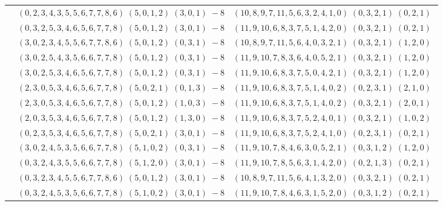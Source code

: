 \documentclass[11pt]{article}
\begin{document}
\begin{longtable}[l]{|c|c|c|}
 \cline{2-3} 
 & $(0 ,2 ,3 ,4 ,3 ,5 ,5 ,6 ,7 ,7 ,8 ,6) \;(5 ,0 ,1 ,2) \;(3 ,0 ,1) \;-8$ & $(10 ,8 ,9 ,7 ,11 ,5 ,6 ,3 ,2 ,4 ,1 ,0) \;(0 ,3 ,2 ,1) \;(0 ,2 ,1) \;$\\ 
 \cline{2-3} 
 & $(0 ,3 ,2 ,5 ,3 ,4 ,6 ,5 ,6 ,7 ,7 ,8) \;(5 ,0 ,1 ,2) \;(3 ,0 ,1) \;-8$ & $(11 ,9 ,10 ,6 ,8 ,3 ,7 ,5 ,1 ,4 ,2 ,0) \;(0 ,3 ,2 ,1) \;(0 ,2 ,1) \;$\\ 
 \cline{2-3} 
 & $(3 ,0 ,2 ,3 ,4 ,5 ,5 ,6 ,7 ,7 ,8 ,6) \;(5 ,0 ,1 ,2) \;(0 ,3 ,1) \;-8$ & $(10 ,8 ,9 ,7 ,11 ,5 ,6 ,4 ,0 ,3 ,2 ,1) \;(0 ,3 ,2 ,1) \;(1 ,2 ,0) \;$\\ 
 \cline{2-3} 
 & $(3 ,0 ,2 ,5 ,4 ,3 ,5 ,6 ,6 ,7 ,7 ,8) \;(5 ,0 ,1 ,2) \;(0 ,3 ,1) \;-8$ & $(11 ,9 ,10 ,7 ,8 ,3 ,6 ,4 ,0 ,5 ,2 ,1) \;(0 ,3 ,2 ,1) \;(1 ,2 ,0) \;$\\ 
 \cline{2-3} 
 & $(3 ,0 ,2 ,5 ,3 ,4 ,6 ,5 ,6 ,7 ,7 ,8) \;(5 ,0 ,1 ,2) \;(0 ,3 ,1) \;-8$ & $(11 ,9 ,10 ,6 ,8 ,3 ,7 ,5 ,0 ,4 ,2 ,1) \;(0 ,3 ,2 ,1) \;(1 ,2 ,0) \;$\\ 
 \cline{2-3} 
 & $(2 ,3 ,0 ,5 ,3 ,4 ,6 ,5 ,6 ,7 ,7 ,8) \;(5 ,0 ,2 ,1) \;(0 ,1 ,3) \;-8$ & $(11 ,9 ,10 ,6 ,8 ,3 ,7 ,5 ,1 ,4 ,0 ,2) \;(0 ,2 ,3 ,1) \;(2 ,1 ,0) \;$\\ 
 \cline{2-3} 
 & $(2 ,3 ,0 ,5 ,3 ,4 ,6 ,5 ,6 ,7 ,7 ,8) \;(5 ,0 ,1 ,2) \;(1 ,0 ,3) \;-8$ & $(11 ,9 ,10 ,6 ,8 ,3 ,7 ,5 ,1 ,4 ,0 ,2) \;(0 ,3 ,2 ,1) \;(2 ,0 ,1) \;$\\ 
 \cline{2-3} 
 & $(2 ,0 ,3 ,5 ,3 ,4 ,6 ,5 ,6 ,7 ,7 ,8) \;(5 ,0 ,1 ,2) \;(1 ,3 ,0) \;-8$ & $(11 ,9 ,10 ,6 ,8 ,3 ,7 ,5 ,2 ,4 ,0 ,1) \;(0 ,3 ,2 ,1) \;(1 ,0 ,2) \;$\\ 
 \cline{2-3} 
 & $(0 ,2 ,3 ,5 ,3 ,4 ,6 ,5 ,6 ,7 ,7 ,8) \;(5 ,0 ,2 ,1) \;(3 ,0 ,1) \;-8$ & $(11 ,9 ,10 ,6 ,8 ,3 ,7 ,5 ,2 ,4 ,1 ,0) \;(0 ,2 ,3 ,1) \;(0 ,2 ,1) \;$\\ 
 \cline{2-3} 
 & $(3 ,0 ,2 ,4 ,5 ,3 ,5 ,6 ,6 ,7 ,7 ,8) \;(5 ,1 ,0 ,2) \;(0 ,3 ,1) \;-8$ & $(11 ,9 ,10 ,7 ,8 ,4 ,6 ,3 ,0 ,5 ,2 ,1) \;(0 ,3 ,1 ,2) \;(1 ,2 ,0) \;$\\ 
 \cline{2-3} 
 & $(0 ,3 ,2 ,4 ,3 ,5 ,5 ,6 ,6 ,7 ,7 ,8) \;(5 ,1 ,2 ,0) \;(3 ,0 ,1) \;-8$ & $(11 ,9 ,10 ,7 ,8 ,5 ,6 ,3 ,1 ,4 ,2 ,0) \;(0 ,2 ,1 ,3) \;(0 ,2 ,1) \;$\\ 
 \cline{2-3} 
 & $(0 ,3 ,2 ,3 ,4 ,5 ,5 ,6 ,7 ,7 ,8 ,6) \;(5 ,0 ,1 ,2) \;(3 ,0 ,1) \;-8$ & $(10 ,8 ,9 ,7 ,11 ,5 ,6 ,4 ,1 ,3 ,2 ,0) \;(0 ,3 ,2 ,1) \;(0 ,2 ,1) \;$\\ 
 \cline{2-3} 
 & $(0 ,3 ,2 ,4 ,5 ,3 ,5 ,6 ,6 ,7 ,7 ,8) \;(5 ,1 ,0 ,2) \;(3 ,0 ,1) \;-8$ & $(11 ,9 ,10 ,7 ,8 ,4 ,6 ,3 ,1 ,5 ,2 ,0) \;(0 ,3 ,1 ,2) \;(0 ,2 ,1) \;$\\ 

\end{longtable}
\end{document}
